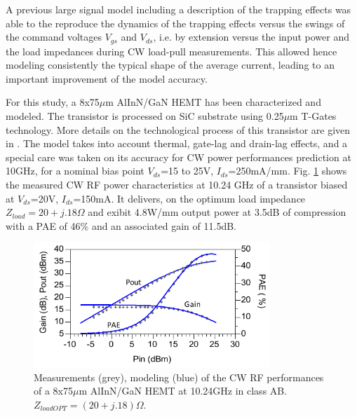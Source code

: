 \documentclass[conference]{IEEEtran}
\begin{document}
A previous large signal model including a description of the trapping effects \cite{Jardel2007b} was able to the reproduce the dynamics of the trapping effects versus the swings of the command voltages $V_{gs}$ and $V_{ds}$, i.e. by extension versus the input power and the load impedances during CW load-pull measurements. This allowed hence modeling consistently the typical shape of the average current, leading to an important improvement of the model accuracy. 

For this study, a 8x75$\mu$m AlInN/GaN HEMT has been characterized and modeled. The transistor is processed on SiC substrate using 0.25$\mu$m T-Gates technology. More details on the technological process of this transistor are given in \cite{jardel2012first}. 
The model takes into account thermal, gate-lag and drain-lag effects, and a special care was taken on its accuracy for CW power performances prediction at 10GHz, for a nominal bias point $V_{ds}$=15 to 25V, $I_{ds}$=250mA/mm. 
Fig. \ref{LP} shows the measured CW RF power characteristics at 10.24 GHz of a transistor biased at $V_{ds}$=20V, $I_{ds}$=150mA.  It delivers, on the optimum load impedance $Z_{load}=20+j.18\Omega$ and exibit 4.8W/mm output power at 3.5dB of compression with a PAE of 46\% and an associated gain of 11.5dB. 

\begin{figure}[ht!] %
\centering
\includegraphics[width=3.5in]{FigureLP_ancien_mod.pdf}
\caption{Measurements (grey), modeling (blue) of the CW RF performances of a 8x75$\mu$m AlInN/GaN HEMT at 10.24GHz in class AB. $Z_{loadOPT} = (20+j.18) \Omega$.}
\label{LP}
\end{figure}
\end{document}

